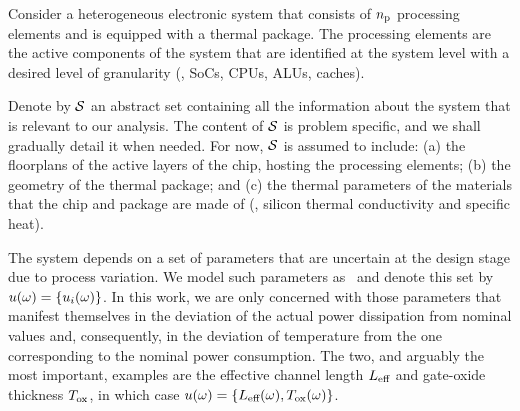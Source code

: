 Consider a heterogeneous electronic system that consists of ${n_\text{p}}$ processing elements and is equipped with a thermal package.
The processing elements are the active components of the system that are identified at the system level with a desired level of granularity (\eg, SoCs, CPUs, ALUs, caches).

Denote by $\mathcal{S}$ an abstract set containing all the information about the system that is relevant to our analysis.
The content of $\mathcal{S}$ is problem specific, and we shall gradually detail it when needed.
For now, $\mathcal{S}$ is assumed to include: (a) the floorplans of the active layers of the chip, hosting the processing elements; (b) the geometry of the thermal package; and (c) the thermal parameters of the materials that the chip and package are made of (\eg, silicon thermal conductivity and specific heat).

The system depends on a set of parameters that are uncertain at the design stage due to process variation.
We model such parameters as \rvs\ and denote this set by $u(\omega) = \{ u_i(\omega) \}$.
In this work, we are only concerned with those parameters that manifest themselves in the deviation of the actual power dissipation from nominal values and, consequently, in the deviation of temperature from the one corresponding to the nominal power consumption.
The two, and arguably the most important, examples are the effective channel length $L_\text{eff}$ and gate-oxide thickness $T_\text{ox}$, in which case $u(\omega) = \{ L_\text{eff}(\omega), T_\text{ox}(\omega) \}$.
